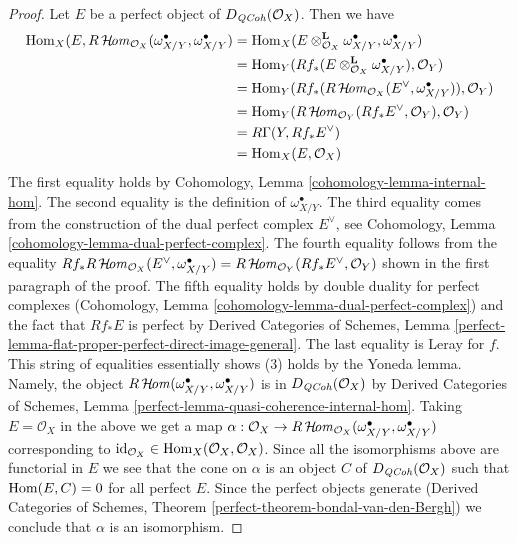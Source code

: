 \begin{proof}
\medskip\noindent
Let $E$ be a perfect object of $D_{\mathit{QCoh}}(\mathcal{O}_X)$. Then
we have
\begin{align*}
\mathop{\mathrm{Hom}}\nolimits_X(E, R\mathop{\mathcal{H}\!\mathit{om}}\nolimits_{\mathcal{O}_X}(\omega_{X/Y}^\bullet, \omega_{X/Y}^\bullet)
& =
\mathop{\mathrm{Hom}}\nolimits_X(E \otimes_{\mathcal{O}_X}^\mathbf{L} \omega_{X/Y}^\bullet,
\omega_{X/Y}^\bullet) \\
& =
\mathop{\mathrm{Hom}}\nolimits_Y(Rf_*(E \otimes_{\mathcal{O}_X}^\mathbf{L} \omega_{X/Y}^\bullet),
\mathcal{O}_Y) \\
& =
\mathop{\mathrm{Hom}}\nolimits_Y(Rf_*(R\mathop{\mathcal{H}\!\mathit{om}}\nolimits_{\mathcal{O}_X}(E^\vee, \omega_{X/Y}^\bullet)),
\mathcal{O}_Y) \\
& =
\mathop{\mathrm{Hom}}\nolimits_Y(R\mathop{\mathcal{H}\!\mathit{om}}\nolimits_{\mathcal{O}_Y}(Rf_*E^\vee, \mathcal{O}_Y),
\mathcal{O}_Y) \\
& =
R\Gamma(Y, Rf_*E^\vee) \\
& =
\mathop{\mathrm{Hom}}\nolimits_X(E, \mathcal{O}_X)
\end{align*}
The first equality holds by Cohomology, Lemma
\ref{cohomology-lemma-internal-hom}.
The second equality is the definition of $\omega_{X/Y}^\bullet$.
The third equality comes from the construction of the dual perfect
complex $E^\vee$, see Cohomology, Lemma
\ref{cohomology-lemma-dual-perfect-complex}.
The fourth equality follows from the equality
$Rf_*R\mathop{\mathcal{H}\!\mathit{om}}\nolimits_{\mathcal{O}_X}(E^\vee, \omega_{X/Y}^\bullet) =
R\mathop{\mathcal{H}\!\mathit{om}}\nolimits_{\mathcal{O}_Y}(Rf_*E^\vee, \mathcal{O}_Y)$
shown in the first paragraph of the proof.
The fifth equality holds by double duality for perfect complexes
(Cohomology, Lemma
\ref{cohomology-lemma-dual-perfect-complex})
and the fact that $Rf_*E$ is perfect by
Derived Categories of Schemes, Lemma
\ref{perfect-lemma-flat-proper-perfect-direct-image-general}.
The last equality is Leray for $f$.
This string of equalities essentially shows (3)
holds by the Yoneda lemma. Namely, the object
$R\mathop{\mathcal{H}\!\mathit{om}}\nolimits(\omega_{X/Y}^\bullet, \omega_{X/Y}^\bullet)$
is in $D_{\mathit{QCoh}}(\mathcal{O}_X)$ by Derived Categories of Schemes, Lemma
\ref{perfect-lemma-quasi-coherence-internal-hom}.
Taking $E = \mathcal{O}_X$ in the above we get a map
$\alpha : \mathcal{O}_X \to
R\mathop{\mathcal{H}\!\mathit{om}}\nolimits_{\mathcal{O}_X}(\omega_{X/Y}^\bullet, \omega_{X/Y}^\bullet)$
corresponding to
$\text{id}_{\mathcal{O}_X} \in \mathop{\mathrm{Hom}}\nolimits_X(\mathcal{O}_X, \mathcal{O}_X)$.
Since all the isomorphisms above are functorial in $E$ we
see that the cone on $\alpha$ is an object $C$ of $D_{\mathit{QCoh}}(\mathcal{O}_X)$
such that $\mathop{\mathrm{Hom}}\nolimits(E, C) = 0$ for all perfect $E$.
Since the perfect objects generate
(Derived Categories of Schemes, Theorem
\ref{perfect-theorem-bondal-van-den-Bergh})
we conclude that $\alpha$ is an isomorphism.
\end{proof}

